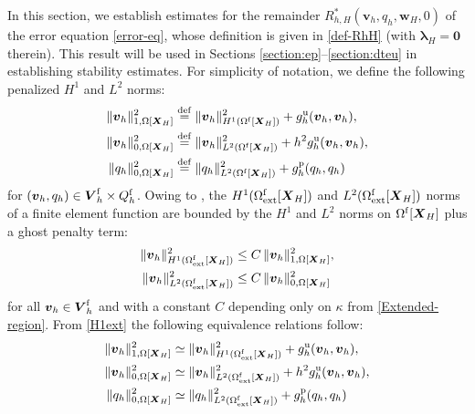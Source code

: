 \documentclass[11pt,reqno]{amsart}
\theoremstyle{definition}
\theoremstyle{plain}
\numberwithin{theorem}{section}
\numberwithin{proposition}{section}
\numberwithin{lemma}{section}
\numberwithin{equation}{section}
\newcommand{\bs}[1]{\boldsymbol{#1}}
\newcommand{\bv}{{\bs v}}
\renewcommand{\(}{\bigl(}
\renewcommand{\)}{\bigr)}
\def\eqd{\stackrel{\mathrm{def}}{=}}
\begin{document}
In this section, we establish estimates for the remainder $R_{h,H}^*({\bs v}_h, q_h , {\bs w}_H, 0)$ of the error equation \eqref{error-eq}, whose definition is given in \eqref{def-RhH} (with $\bs \lambda_H=\bs 0$ therein). This result will be used in Sections \ref{section:ep}--\ref{section:dteu} in establishing stability estimates. For simplicity of notation, we define the following penalized $H^1$ and $L^2$ norms:
\begin{subequations}\label{1-0-norm}
\begin{align}
\|{\bs v}_h\|_{1,\Omega[{\bs X}_H]}^2 &\eqd\|{\bs v}_h\|_{H^1(\Omega^{\rm f}[{\bs X}_H])}^2+ g_h^{\rm u}({\bs v}_h,{\bs v}_h),\\
\|{\bs v}_h\|_{0,\Omega[{\bs X}_H]}^2 &\eqd\|{\bs v}_h\|_{L^2(\Omega^{\rm f}[{\bs X}_H])}^2+ h^2 g_h^{\rm u}({\bs v}_h,{\bs v}_h),\\
\|q_h\|_{0,\Omega[{\bs X}_H]}^2 &\eqd\|q_h\|_{L^2(\Omega^{\rm f}[\bs X_H])}^2+ g_h^{\rm p}(q_h,q_h)
\end{align}
\end{subequations}
for $({\bs v}_h,q_h) \in \bs V_h^{\rm f}
\times  Q_h^{\rm f}$.
Owing to \cite[Lemma~5.2]{lehrenfeld2019eulerian}, the $H^1(\Omega^{\rm f}_{\rm ext}[\bs X_H])$ and $L^2(\Omega^{\rm f}_{\rm ext}[\bs X_H])$ norms of a finite element function are bounded by the $H^1$ and $L^2$ norms on $\Omega^{\rm f}[\bs X_H]$ plus a ghost penalty term:
\begin{subequations}\label{H1ext}
\begin{align}
\|\bv_h\|_{H^1(\Omega^{\rm f}_{\rm ext}[\bs X_H])}^2
    &\le C\,  \|{\bs v}_h\|_{1,\Omega[{\bs X}_H]}^2 ,\\
\|\bv_h\|_{L^2(\Omega^{\rm f}_{\rm ext}[\bs X_H])}^2
    &\le C\,  \|{\bs v}_h\|_{0,\Omega[{\bs X}_H]}^2 
\end{align}
\end{subequations}
for all $\bv_h\in {\bs V}_h^{\rm f}$ and 
with a  constant $C$ depending only on $\kappa$ from \eqref{Extended-region}. 
From \eqref{H1ext} the following equivalence relations follow: 
\begin{subequations} \label{0-0-norm}
\begin{align}
\|\bv_h\|_{1,\Omega[{\bs X}_H]}^2 &\simeq\|{\bs v}_h\|_{H^1(\Omega^{\rm f}_{\rm ext}[\bs X_H])}^2+ g_h^{\rm u}(\bv_h,\bv_h) , \label{0-0-norm-a}\\
\|\bv_h\|_{0,\Omega[{\bs X}_H]}^2 &\simeq\|{\bs v}_h\|_{L^2(\Omega^{\rm f}_{\rm ext}[\bs X_H])}^2 + h^2g_h^{\rm u}(\bv_h,\bv_h)   , \label{0-0-norm-a2}\\
\|q_h\|_{0,\Omega[{\bs X}_H]}^2 &\simeq\|q_h\|_{L^2(\Omega^{\rm f}_{\rm ext}[\bs X_H])}^2+ g_h^{\rm p}(q_h,q_h) \label{0-0-norm-b}
\end{align}
\end{subequations}
\end{document}
